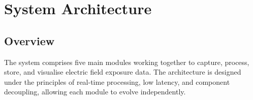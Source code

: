 \documentclass[12pt,a4paper]{article}
\begin{document}
\section{System Architecture}

\subsection{Overview}

The system comprises five main modules working together to capture, process, store, and visualise electric field exposure data. The architecture is designed under the principles of real-time processing, low latency, and component decoupling, allowing each module to evolve independently.
\end{document}
